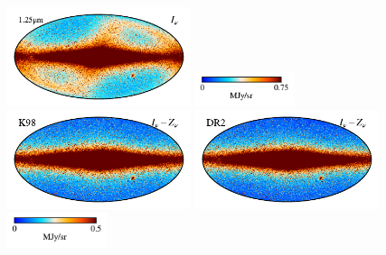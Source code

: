 \documentclass[twocolumn]{aa}
\begin{document}
\begin{figure}
    \centering

    \includegraphics[height=2.90cm]{figs/compare_zsma/cosmoglobe_ma_01.pdf}%
    \includegraphics[width=2.90cm,angle=90]{figs/compare_zsma/cbar_tot_01.pdf}%
    \includegraphics[height=2.90cm]{figs/compare_zsma/dirbe_zsma_01.pdf}%
    \includegraphics[height=2.90cm]{figs/compare_zsma/cosmoglobe_zsma_01.pdf}%
    \includegraphics[width=2.90cm,angle=90]{figs/compare_zsma/cbar_01.pdf}%
    \\



\end{figure}
\end{document}
